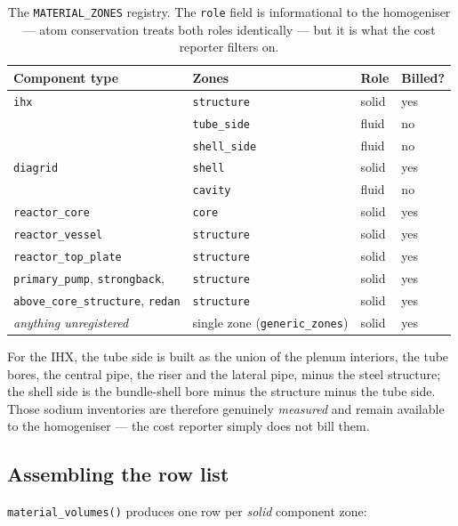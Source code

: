 \documentclass[9pt,a4paper]{extarticle}
\newcommand{\code}[1]{\texttt{\small #1}}
\begin{document}
\begin{table}[h]
\centering
\footnotesize
\begin{tabular}{@{}llll@{}}
\toprule
\textbf{Component type} & \textbf{Zones} & \textbf{Role} & \textbf{Billed?} \\
\midrule
\code{ihx}                  & \code{structure}   & solid & yes \\
                            & \code{tube\_side}  & fluid & no  \\
                            & \code{shell\_side} & fluid & no  \\
\code{diagrid}              & \code{shell}       & solid & yes \\
                            & \code{cavity}      & fluid & no  \\
\code{reactor\_core}        & \code{core}        & solid & yes \\
\code{reactor\_vessel}      & \code{structure}   & solid & yes \\
\code{reactor\_top\_plate}  & \code{structure}   & solid & yes \\
\code{primary\_pump}, \code{strongback},    & \code{structure} & solid & yes \\
\code{above\_core\_structure}, \code{redan} & \code{structure} & solid & yes \\
\midrule
\emph{anything unregistered} & single zone (\code{generic\_zones}) & solid & yes \\
\bottomrule
\end{tabular}
\caption{The \code{MATERIAL\_ZONES} registry. The \code{role} field is
informational to the homogeniser --- atom conservation treats both roles
identically --- but it is what the cost reporter filters on.}
\label{tab:zones}
\end{table}

For the IHX, the tube side is built as the union of the plenum interiors, the
tube bores, the central pipe, the riser and the lateral pipe, minus the steel
structure; the shell side is the bundle-shell bore minus the structure minus the
tube side. Those sodium inventories are therefore genuinely \emph{measured} and
remain available to the homogeniser --- the cost reporter simply does not bill
them.

\subsection{Assembling the row list}

\code{material\_volumes()} produces one row per \emph{solid} component zone:
\end{document}
